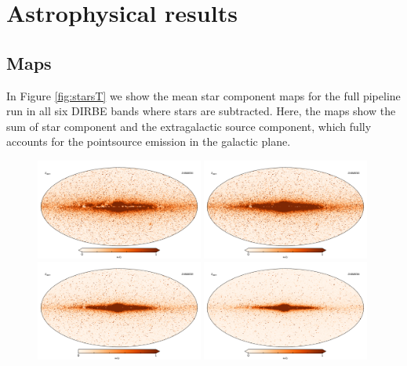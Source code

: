 \documentclass{aa}
\begin{document}
\section{Astrophysical results}
\label{sec:results}

\subsection{Maps}

In Figure \ref{fig:starsT} we show the mean star component maps for the full pipeline run in all six DIRBE bands where stars are subtracted. Here, the maps show the sum of star component and the extragalactic source component, which fully accounts for the pointsource emission in the galactic plane.

\begin{figure}
  \centering
  \includegraphics[width=0.49\textwidth]{figs/starmaps/stars_mean_01.pdf}
  \includegraphics[width=0.49\textwidth]{figs/starmaps/stars_mean_02.pdf} \\
  \includegraphics[width=0.49\textwidth]{figs/starmaps/stars_mean_03.pdf}
  \includegraphics[width=0.49\textwidth]{figs/starmaps/stars_mean_04.pdf} \\

\end{figure}
\end{document}
